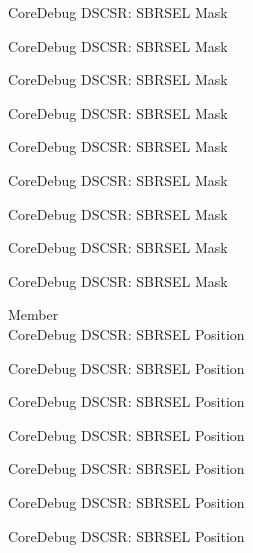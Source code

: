 \begin{DoxyRefList}
\label{deprecated__deprecated000649}%
%
Core\+Debug DSCSR\+: SBRSEL Mask 

\label{deprecated__deprecated000755}%
%
Core\+Debug DSCSR\+: SBRSEL Mask 

\label{deprecated__deprecated000809}%
%
Core\+Debug DSCSR\+: SBRSEL Mask 

\label{deprecated__deprecated000885}%
%
Core\+Debug DSCSR\+: SBRSEL Mask 

\label{deprecated__deprecated000948}%
%
Core\+Debug DSCSR\+: SBRSEL Mask 

\label{deprecated__deprecated001027}%
%
Core\+Debug DSCSR\+: SBRSEL Mask 

\label{deprecated__deprecated001103}%
%
Core\+Debug DSCSR\+: SBRSEL Mask 

\label{deprecated__deprecated001206}%
%
Core\+Debug DSCSR\+: SBRSEL Mask 

\label{deprecated__deprecated001308}%
%
Core\+Debug DSCSR\+: SBRSEL Mask  
\item[Member \doxylink{group___c_m_s_i_s___s_c_b_ga7450603163415ab4d4e4a7a767879eae}{Core\+Debug\+\_\+\+DSCSR\+\_\+\+SBRSEL\+\_\+\+Pos} ]\hfill \\
\label{deprecated__deprecated000095}%
%
Core\+Debug DSCSR\+: SBRSEL Position 

\label{deprecated__deprecated000149}%
%
Core\+Debug DSCSR\+: SBRSEL Position 

\label{deprecated__deprecated000225}%
%
Core\+Debug DSCSR\+: SBRSEL Position 

\label{deprecated__deprecated000288}%
%
Core\+Debug DSCSR\+: SBRSEL Position 

\label{deprecated__deprecated000367}%
%
Core\+Debug DSCSR\+: SBRSEL Position 

\label{deprecated__deprecated000443}%
%
Core\+Debug DSCSR\+: SBRSEL Position 

\label{deprecated__deprecated000546}%
%
Core\+Debug DSCSR\+: SBRSEL Position 


\end{DoxyRefList}
